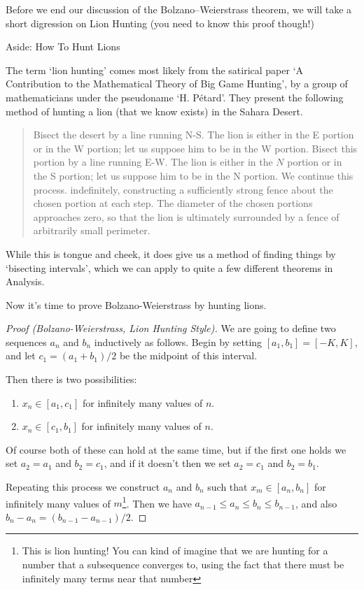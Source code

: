 Before we end our discussion of the Bolzano–Weierstrass theorem, we will take a short digression on Lion Hunting (you need to know this proof though!)


\begin{aside}{Aside: How To Hunt Lions}

	The term `lion hunting' comes most likely from the satirical paper `A Contribution to the Mathematical Theory of Big Game Hunting', by a group of mathematicians under the pseudoname `H. Pétard'. They present the following method of hunting a lion (that we know exists) in the Sahara Desert.

	\begin{quote}
		Bisect the desert by a line running N-S. The lion is either in the E portion or in the W portion; let us suppose him to be in the W portion. Bisect this portion by a line running E-W. The lion is either in the $N$ portion or in the S portion; let us suppose him to be in the N portion. We continue this process. indefinitely, constructing a sufficiently strong fence about the chosen portion at each step. The diameter of the chosen portions approaches zero, so that the lion is ultimately surrounded by a fence of arbitrarily small perimeter.
	\end{quote}
	While this is tongue and cheek, it does give us a method of finding things by `bisecting intervals', which we can apply to quite a few different theorems in Analysis. 

	Now it's time to prove Bolzano-Weierstrass by hunting lions.


\begin{proof}[Proof (Bolzano-Weierstrass, Lion Hunting Style)]
	We are going to define two sequences $a_n$ and $b_n$ inductively as follows. Begin by setting $[a_1, b_1] = [-K, K]$, and let $c_1 = (a_1 + b_1)/2$ be the midpoint of this interval.

	Then there is two possibilities:
	\begin{enumerate}
		\item $x_n \in [a_1, c_1]$ for infinitely many values of $n$.
		\item $x_n \in [c_1, b_1]$ for infinitely many values of $n$.
	\end{enumerate}
	Of course both of these can hold at the same time, but if the first one holds we set $a_2 = a_1$ and $b_2 = c_1$, and if it doesn't then we set $a_2 = c_1$ and $b_2 = b_1$.

	Repeating this process we construct $a_n$ and $b_n$ such that $x_m \in [a_n, b_n]$ for infinitely many values of $m$\footnote{This is lion hunting! You can kind of imagine that we are hunting for a number that a subsequence converges to, using the fact that there must be infinitely many terms near that number}.
	Then we have $a_{n - 1} \leq a_n \leq b_n \leq b_{n - 1}$, and also $b_n - a_n = (b_{n - 1} - a_{n - 1})/2$. 


\end{proof}
\end{aside}
